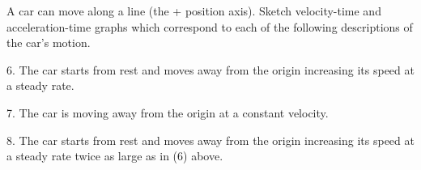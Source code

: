 
A car can move along a line (the + position axis). Sketch velocity-time and
acceleration-time graphs which correspond to each of the following descriptions
of the car's motion.

6. The car starts from rest and moves away from the origin increasing its speed
at a steady rate.

\hspace{0.4in}
\begin{lab_axis}[lab_noticks_2quads,
	height = {1.2in}, width = {1.9in},
	xlabel={Time},
	ylabel={Velocity},
	plus_minus_zero_labels,
	]
\end{lab_axis}
\hspace{0.2in}
\begin{lab_axis}[lab_noticks_2quads,
	height = {1.2in}, width = {1.9in},
	xlabel={Time},
	ylabel={Acceleration},
	plus_minus_zero_labels,
	]
\end{lab_axis}

7. The car is moving away from the origin at a constant velocity.


\hspace{0.4in}
\begin{lab_axis}[lab_noticks_2quads,
	height = {1.2in}, width = {1.9in},
	xlabel={Time},
	ylabel={Velocity},
	plus_minus_zero_labels,
	]
\end{lab_axis}
\hspace{0.2in}
\begin{lab_axis}[lab_noticks_2quads,
	height = {1.2in}, width = {1.9in},
	xlabel={Time},
	ylabel={Acceleration},
	plus_minus_zero_labels,
	]
\end{lab_axis}

8. The car starts from rest and moves away from the origin increasing its speed
at a steady rate twice as large as in (6) above.

